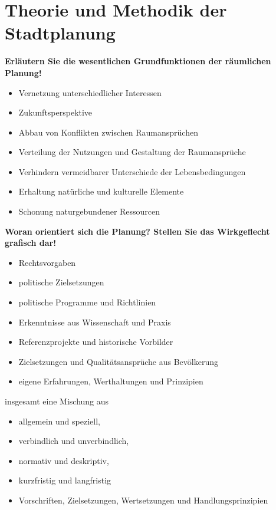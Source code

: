 \documentclass[]{article}
\newenvironment{question}{\vspace{8mm}\noindent\bfseries}{\\}
\begin{document}
\section{Theorie und Methodik der Stadtplanung}
\begin{question}
	Erläutern Sie die wesentlichen Grundfunktionen der räumlichen Planung!
\end{question}

\begin{itemize}
	\item Vernetzung unterschiedlicher Interessen
	\item Zukunftsperspektive
	\item Abbau von Konflikten zwischen Raumansprüchen
	\item Verteilung der Nutzungen und Gestaltung der Raumansprüche
	\item Verhindern vermeidbarer Unterschiede der Lebensbedingungen
	\item Erhaltung natürliche und kulturelle Elemente
	\item Schonung naturgebundener Ressourcen
\end{itemize}


\begin{question}
	Woran orientiert sich die Planung? Stellen Sie das Wirkgeflecht grafisch dar!
\end{question}

\begin{itemize}
	\item Rechtsvorgaben
	\item politische Zielsetzungen
	\item politische Programme und Richtlinien
	\item Erkenntnisse aus Wissenschaft und Praxis
	\item Referenzprojekte und historische Vorbilder
	\item Zielsetzungen und Qualitätsansprüche aus Bevölkerung
	\item eigene Erfahrungen, Werthaltungen und Prinzipien
\end{itemize}

insgesamt eine Mischung aus

\begin{itemize}
	\item allgemein und speziell,
	\item verbindlich und unverbindlich,
	\item normativ und deskriptiv,
	\item kurzfristig und langfristig
	\item Vorschriften, Zielsetzungen, Wertsetzungen und Handlungsprinzipien
\end{itemize}
\end{document}

